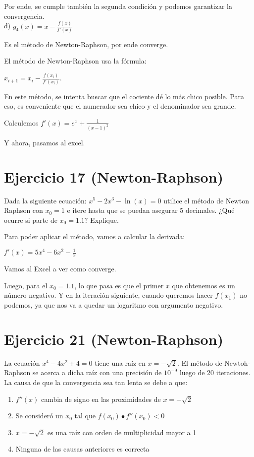 \documentclass[11pt]{article}
\begin{document}
	Por ende, se cumple también la segunda condición y podemos garantizar la convergencia.\\
	
	d) $\displaystyle g_4(x)=x-\frac{f(x)}{f'(x)}$

	Es el método de Newton-Raphson, por ende converge.
	
	El método de Newton-Raphson usa la fórmula:
	
	$\displaystyle x_{i+1}=x_i-\frac{f(x_i)}{f'(x_i)}$.
	
	En este método, se intenta buscar que el cociente dé lo más chico posible. Para eso, es conveniente que el numerador sea chico y el denominador sea grande.
	
	Calculemos $\displaystyle f'(x)=e^x+\frac{1}{(x-1)^2}$
	
	Y ahora, pasamos al excel.
	
	\section{Ejercicio 17 (Newton-Raphson)}
	Dada la siguiente ecuación: $x^5-2x^3-\ln(x)=0$ utilice el método de Newton Raphson con $x_0=1$ e itere hasta que se puedan asegurar 5 decimales. ¿Qué ocurre si parte de $x_0=1.1$? Explique.
	
	Para poder aplicar el método, vamos a calcular la derivada:
	
	$\displaystyle f'(x)=5x^4-6x^2-\frac{1}{x}$
	
	Vamos al Excel a ver como converge.
	
	Luego, para el $x_0=1.1$, lo que pasa es que el primer $x$ que obtenemos es un número negativo. Y en la iteración siguiente, cuando queremos hacer $f(x_1)$ no podemos, ya que nos va a quedar un logaritmo con argumento negativo.
	
	\section{Ejercicio 21 (Newton-Raphson)}
	La ecuación $x^4-4x^2+4=0$ tiene una raíz en $x=-\sqrt{2}$. El método de Newtoh-Raphson se acerca a dicha raíz con una precisión de $10^{-9}$ luego de 20 iteraciones. La causa de que la convergencia sea tan lenta se debe a que:
	
	\begin{enumerate}[label=\alph*)]
		\item $f''(x)$ cambia de signo en las proximidades de $x=-\sqrt{2}$
		\item Se consideró un $x_0$ tal que $f(x_0)\bullet f''(x_0)<0$
		\item $x=-\sqrt{2}$ es una raíz con orden de multiplicidad mayor a 1
		\item Ninguna de las causas anteriores es correcta
	\end{enumerate}
\end{document}
